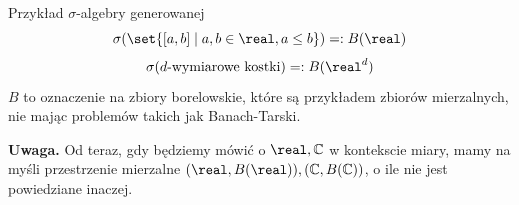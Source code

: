 \begin{example}
	\label{borel-set}
	Przykład \(\sigma\)-algebry generowanej
	\[
		\sigma(\set{[a, b] \mid a, b \in \real, a \leq b}) =: B(\real)
	\]
	\[
		\sigma(d\text{-wymiarowe kostki}) =: B(\real^d)
	\]
	\(B\) to oznaczenie na zbiory borelowskie, które są przykładem zbiorów mierzalnych, nie mając problemów takich jak Banach-Tarski.

	\textbf{Uwaga. } Od teraz, gdy będziemy mówić o \(\real, \mathbb{C}\) w kontekscie miary, mamy na myśli przestrzenie mierzalne \((\real, B(\real)), (\mathbb{C}, B(\mathbb{C}))\), o ile nie jest powiedziane inaczej.
\end{example}
